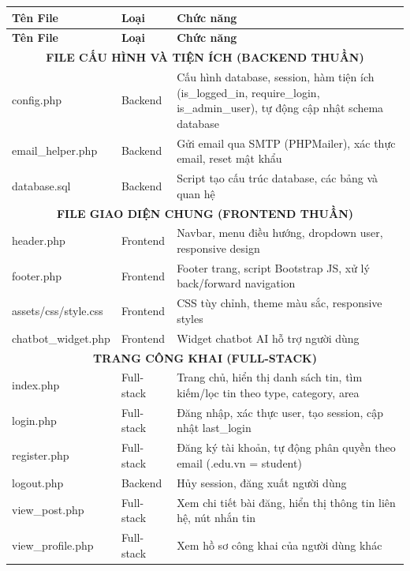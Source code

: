 \documentclass[a4paper,12pt]{article}
\begin{document}
\begin{longtable}{|p{4.5cm}|p{2cm}|p{8cm}|}
\hline
\textbf{Tên File} & \textbf{Loại} & \textbf{Chức năng} \\
\hline
\endfirsthead
\hline
\textbf{Tên File} & \textbf{Loại} & \textbf{Chức năng} \\
\hline
\endhead

\multicolumn{3}{|c|}{\textbf{FILE CẤU HÌNH VÀ TIỆN ÍCH (BACKEND THUẦN)}} \\
\hline
config.php & Backend & Cấu hình database, session, hàm tiện ích (is\_logged\_in, require\_login, is\_admin\_user), tự động cập nhật schema database \\
\hline
email\_helper.php & Backend & Gửi email qua SMTP (PHPMailer), xác thực email, reset mật khẩu \\
\hline
database.sql & Backend & Script tạo cấu trúc database, các bảng và quan hệ \\
\hline

\multicolumn{3}{|c|}{\textbf{FILE GIAO DIỆN CHUNG (FRONTEND THUẦN)}} \\
\hline
header.php & Frontend & Navbar, menu điều hướng, dropdown user, responsive design \\
\hline
footer.php & Frontend & Footer trang, script Bootstrap JS, xử lý back/forward navigation \\
\hline
assets/css/style.css & Frontend & CSS tùy chỉnh, theme màu sắc, responsive styles \\
\hline
chatbot\_widget.php & Frontend & Widget chatbot AI hỗ trợ người dùng \\
\hline

\multicolumn{3}{|c|}{\textbf{TRANG CÔNG KHAI (FULL-STACK)}} \\
\hline
index.php & Full-stack & Trang chủ, hiển thị danh sách tin, tìm kiếm/lọc tin theo type, category, area \\
\hline
login.php & Full-stack & Đăng nhập, xác thực user, tạo session, cập nhật last\_login \\
\hline
register.php & Full-stack & Đăng ký tài khoản, tự động phân quyền theo email (.edu.vn = student) \\
\hline
logout.php & Backend & Hủy session, đăng xuất người dùng \\
\hline
view\_post.php & Full-stack & Xem chi tiết bài đăng, hiển thị thông tin liên hệ, nút nhắn tin \\
\hline
view\_profile.php & Full-stack & Xem hồ sơ công khai của người dùng khác \\
\hline


\end{longtable}
\end{document}

